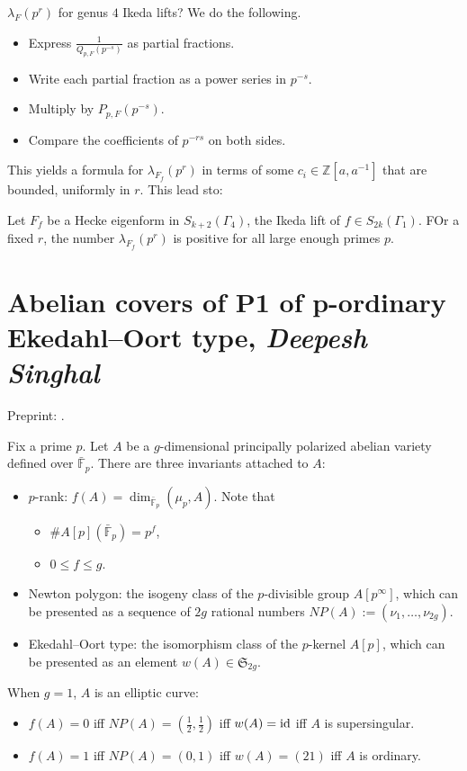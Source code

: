 \documentclass[reqno]{amsart} 
\begin{document}
$\lambda_F(p^r)$ for genus $4$ Ikeda lifts?  We do the following.
\begin{itemize}
\item Express $\frac{1}{Q_{p, F}(p^{- s})}$ as partial fractions.
\item Write each partial fraction as a power series in $p^{- s}$.
\item Multiply by $P_{p, F}(p^{- s})$.
\item Compare the coefficients of $p^{- r s}$ on both sides.
\end{itemize}
This yields a formula for $\lambda_{F_f}(p^r)$ in terms of some $c_i \in \mathbb{Z}[a, a^{-1}]$ that are bounded, uniformly in $r$.  This lead sto:
\begin{theorem}[A, 2024]
  Let $F_f$ be a Hecke eigenform in $S_{k + 2}(\Gamma_4)$, the Ikeda lift of $f \in S_{2 k}(\Gamma_1)$.  FOr a fixed $r$, the number $\lambda_{F_f}(p^r)$ is positive for all large enough primes $p$.
\end{theorem}


\section{Abelian covers of P1 of p-ordinary Ekedahl--Oort type, \textnormal{\emph{Deepesh Singhal }}}

Preprint: \cite{2023arXiv2303.13350}.

Fix a prime $p$.  Let $A$ be a $g$-dimensional principally polarized abelian variety defined over $\bar{\mathbb{F}}_p$.  There are three invariants attached to $A$:
\begin{itemize}
\item $p$-rank: $f(A) = \dim_{\bar{\mathbb{F}}_p}(\mu_p, A)$.  Note that
  \begin{itemize}
  \item $\# A[p](\bar{\mathbb{F}}_p) = p^f$, 
  \item $0 \leq f \leq g$.
  \end{itemize}
\item Newton polygon: the isogeny class of the $p$-divisible group $A[p^\infty]$, which can be presented as a sequence of $2 g$ rational numbers $N P(A) :=(\nu_1, \dotsc, \nu_{2 g})$.
\item Ekedahl--Oort type: the isomorphism class of the $p$-kernel $A[p]$, which can be presented as an element $w(A) \in \mathfrak{S}_{2 g}$.
\end{itemize}

When $g =1$, $A$ is an elliptic curve:
\begin{itemize}
\item $f(A) = 0$ iff $N P(A) =(\tfrac{1}{2}, \tfrac{1}{2})$ iff $w(A) = \operatorname{id}$ iff $A$ is supersingular.
\item $f(A) = 1$ iff $N P(A) =(0, 1)$ iff $w(A) =(21)$ iff $A$ is ordinary.
\end{itemize}
\end{document}
